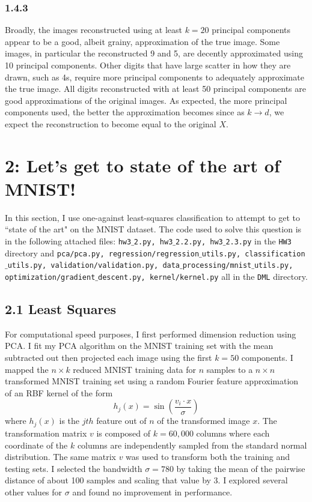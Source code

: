 \documentclass[12pt]{amsart}
\begin{document}
\subsubsection*{1.4.3}
Broadly, the images reconstructed using at least $k = 20$ principal components appear to be a good, albeit grainy, approximation of the true image.  Some images, in particular the reconstructed 9 and 5, are decently approximated using 10 principal components.  Other digits that have large scatter in how they are drawn, such as 4s, require more principal components to adequately approximate the true image.  All digits reconstructed with at least 50 principal components are good approximations of the original images.  As expected, the more principal components used, the better the approximation becomes since as $k \rightarrow d$, we expect the reconstruction to become equal to the original $X$.

\section*{2: Let's get to state of the art of MNIST!}

In this section, I use one-against least-squares classification to attempt to get to ``state of the art" on the MNIST dataset.  The code used to solve this question is in the following attached files: {\tt hw3$\_$2.py, hw3$\_$2.2.py, hw3$\_$2.3.py} in the {\tt HW3} directory and {\tt pca/pca.py, regression/regression$\_$utils.py, classification$\_$utils.py, validation/validation.py, data$\_$processing/mnist$\_$utils.py, optimization/gradient$\_$descent.py, kernel/kernel.py} all in the {\tt DML} directory.

\subsection*{2.1 Least Squares}

For computational speed purposes, I first performed dimension reduction using PCA.  I fit my PCA algorithm on the MNIST training set with the mean subtracted out then projected each image using the first $k = 50$ components.  I mapped the $n \times k$ reduced MNIST training data for $n$ samples to a $n \times n$ transformed MNIST training set using a random Fourier feature approximation of an RBF kernel of the form
\begin{equation} \label{eqn:rbf_kernel}
h_j(x) = \sin \left( \frac{v_i \cdot x}{\sigma} \right)
\end{equation}
where $h_j(x)$ is the $jth$ feature out of $n$ of the transformed image $x$.  The transformation matrix $v$ is composed of $k = 60,000$ columns where each coordinate of the $k$ columns are independently sampled from the standard normal distribution.  The same matrix $v$ was used to transform both the training and testing sets.  I selected the bandwidth $\sigma = 780$ by taking the mean of the pairwise distance of about 100 samples and scaling that value by 3.  I explored several other values for $\sigma$ and found no improvement in performance.  
\end{document}
